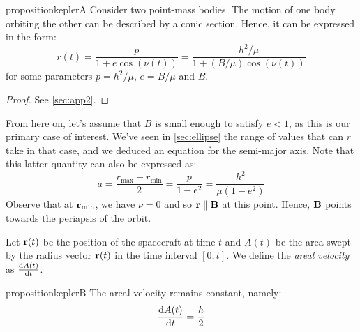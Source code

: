\documentclass[../main.tex]{subfiles}
\begin{document}
\begin{restatable}{proposition}{keplerA}
  \label{prop:two-body}
  Consider two point-mass bodies. The motion of one body orbiting the other can be described by a conic section. Hence, it can be expressed in the form:
  \begin{equation}
    \label{eq:r_conic}
    r(t)=\frac{p}{1+e\cos (\nu(t))}=\frac{h^2/\mu}{1+(B/\mu)\cos(\nu(t))}
  \end{equation}
  for some parameters $p=h^2/\mu$, $e=B/\mu$ and $B$.
\end{restatable}
\begin{proof}
  See \cref{sec:app2}.
\end{proof}
From here on, let's assume that $B$ is small enough to satisfy $e <1$, as this is our primary case of interest. We've seen in \cref{sec:ellipse} the range of values that can $r$ take in that case, and we deduced an equation for the semi-major axis. Note that this latter quantity can also be expressed as:
\begin{equation}\label{eq:semi-major_axis}
  a=\frac{r_\mathrm{max}+r_\mathrm{min}}{2}=\frac{p}{1-e^2}=\frac{h^2}{\mu(1-e^2)}
\end{equation}
Observe that at $\boldsymbol{\mathrm{r}}_\mathrm{min}$, we have $\nu=0$ and so $\boldsymbol{\mathrm{r}}\parallel\boldsymbol{\mathrm{B}}$ at this point. Hence, $\boldsymbol{\mathrm{B}}$ points towards the periapsis of the orbit.
\begin{definition}
  Let $\boldsymbol{\mathrm{r}}(t)$ be the position of the spacecraft at time $t$ and $A(t)$ be the area swept by the radius vector $\boldsymbol{\mathrm{r}}(t)$ in the time interval $[0,t]$. We define the \emph{areal velocity} as $\dv{A(t)}{t}$.
\end{definition}
\begin{restatable}{proposition}{keplerB}
  \label{prop:kepler_second_law}
  The areal velocity remains constant, namely:
  \begin{equation}\label{eq:areal_velocity}
    \dv{A(t)}{t}=\frac{h}{2}
  \end{equation}
\end{restatable}
\end{document}
